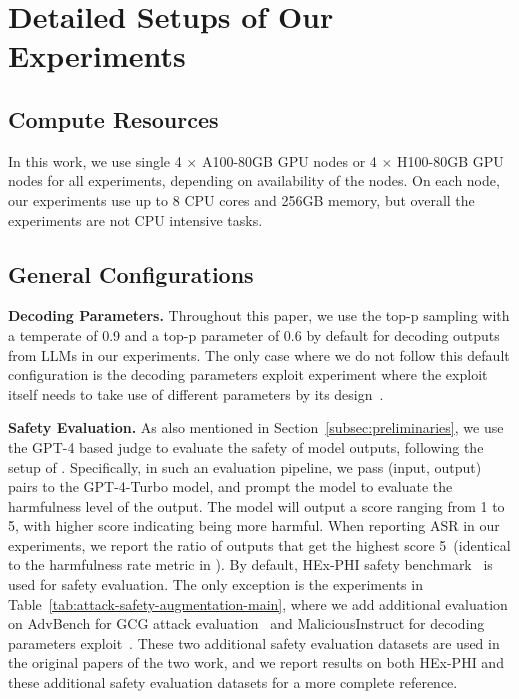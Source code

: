 \section{Detailed Setups of Our Experiments}
\label{appendix:experiment_details}

\subsection{Compute Resources}

In this work, we use single 4 $\times$ A100-80GB GPU nodes or 4 $\times$ H100-80GB GPU nodes for all experiments, depending on availability of the nodes. On each node, our experiments use up to 8 CPU cores and 256GB memory, but overall the experiments are not CPU intensive tasks.


\subsection{General Configurations}

\textbf{Decoding Parameters.} Throughout this paper, we use the top-p sampling with a temperate of 0.9 and a top-p parameter of 0.6 by default for decoding outputs from LLMs in our experiments. The only case where we do not follow this default configuration is the decoding parameters exploit experiment where the exploit itself needs to take use of different parameters by its design~\cite{huang2023catastrophic}.

\textbf{Safety Evaluation.} As also mentioned in Section~\ref{subsec:preliminaries}, we use the GPT-4 based judge to evaluate the safety of model outputs, following the setup of \citet{qi2023fine}. Specifically, in such an evaluation pipeline, we pass (input, output) pairs to the GPT-4-Turbo model, and prompt the model to evaluate the harmfulness level of the output. The model will output a score ranging from 1 to 5, with higher score indicating being more harmful. When reporting ASR in our experiments, we report the ratio of outputs that get the highest score 5~(identical to the harmfulness rate metric in \citet{qi2023fine}). By default, HEx-PHI safety benchmark~\cite{hexphi} is used for safety evaluation. The only exception is the experiments in Table~\ref{tab:attack-safety-augmentation-main}, where we add additional evaluation on AdvBench for GCG attack evaluation~\cite{zou2023universal} and MaliciousInstruct for decoding parameters exploit~\cite{huang2023catastrophic}. These two additional safety evaluation datasets are used in the original papers of the two work, and we report results on both HEx-PHI and these additional safety evaluation datasets for a more complete reference.




